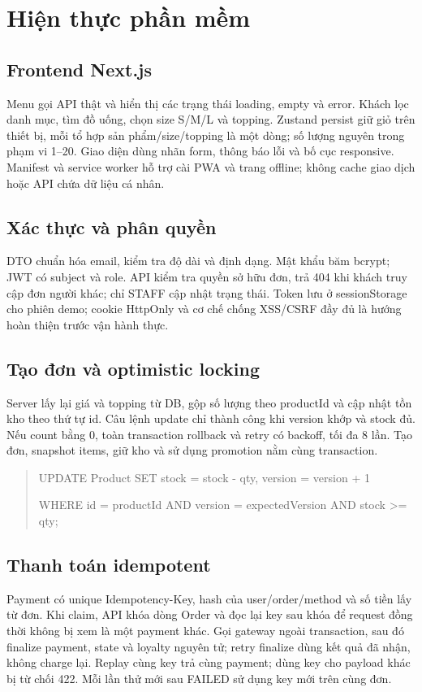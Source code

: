 \documentclass[a4paper,12pt,oneside]{report}
\begin{document}
\chapter{Hiện thực phần mềm}
\section{Frontend Next.js}
Menu gọi API thật và hiển thị các trạng thái loading, empty và error. Khách lọc danh mục, tìm đồ uống, chọn size S/M/L và topping. Zustand persist giữ giỏ trên thiết bị, mỗi tổ hợp sản phẩm/size/topping là một dòng; số lượng nguyên trong phạm vi 1–20. Giao diện dùng nhãn form, thông báo lỗi và bố cục responsive. Manifest và service worker hỗ trợ cài PWA và trang offline; không cache giao dịch hoặc API chứa dữ liệu cá nhân.
\section{Xác thực và phân quyền}
DTO chuẩn hóa email, kiểm tra độ dài và định dạng. Mật khẩu băm bcrypt; JWT có subject và role. API kiểm tra quyền sở hữu đơn, trả 404 khi khách truy cập đơn người khác; chỉ STAFF cập nhật trạng thái. Token lưu ở sessionStorage cho phiên demo; cookie HttpOnly và cơ chế chống XSS/CSRF đầy đủ là hướng hoàn thiện trước vận hành thực.
\section{Tạo đơn và optimistic locking}
Server lấy lại giá và topping từ DB, gộp số lượng theo productId và cập nhật tồn kho theo thứ tự id. Câu lệnh update chỉ thành công khi version khớp và stock đủ. Nếu count bằng 0, toàn transaction rollback và retry có backoff, tối đa 8 lần. Tạo đơn, snapshot items, giữ kho và sử dụng promotion nằm cùng transaction.
\begin{quote}\small\ttfamily
UPDATE Product SET stock = stock - qty, version = version + 1\par
WHERE id = productId AND version = expectedVersion AND stock >= qty;
\end{quote}
\section{Thanh toán idempotent}
Payment có unique Idempotency-Key, hash của user/order/method và số tiền lấy từ đơn. Khi claim, API khóa dòng Order và đọc lại key sau khóa để request đồng thời không bị xem là một payment khác. Gọi gateway ngoài transaction, sau đó finalize payment, state và loyalty nguyên tử; retry finalize dùng kết quả đã nhận, không charge lại. Replay cùng key trả cùng payment; dùng key cho payload khác bị từ chối 422. Mỗi lần thử mới sau FAILED sử dụng key mới trên cùng đơn.
\end{document}
